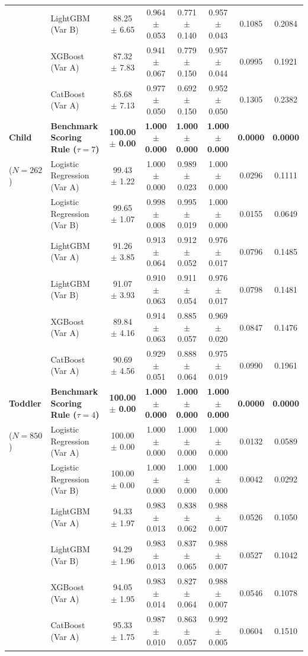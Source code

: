 \begin{table}[t]
\begin{tabular}{llcccccc}
 & LightGBM (Var B) & 88.25 $\pm$ 6.65 & 0.964 $\pm$ 0.053 & 0.771 $\pm$ 0.140 & 0.957 $\pm$ 0.043 & 0.1085 & 0.2084 \\
 & XGBoost (Var A) & 87.32 $\pm$ 7.83 & 0.941 $\pm$ 0.067 & 0.779 $\pm$ 0.150 & 0.957 $\pm$ 0.044 & 0.0995 & 0.1921 \\
 & CatBoost (Var A) & 85.68 $\pm$ 7.13 & 0.977 $\pm$ 0.050 & 0.692 $\pm$ 0.150 & 0.952 $\pm$ 0.050 & 0.1305 & 0.2382 \\
\midrule
\textbf{Child} & \textbf{Benchmark Scoring Rule ($\tau = 7$)} & \textbf{100.00 $\pm$ 0.00} & \textbf{1.000 $\pm$ 0.000} & \textbf{1.000 $\pm$ 0.000} & \textbf{1.000 $\pm$ 0.000} & \textbf{0.0000} & \textbf{0.0000} \\
($N = 262$) & Logistic Regression (Var A) & 99.43 $\pm$ 1.22 & 1.000 $\pm$ 0.000 & 0.989 $\pm$ 0.023 & 1.000 $\pm$ 0.000 & 0.0296 & 0.1111 \\
 & Logistic Regression (Var B) & 99.65 $\pm$ 1.07 & 0.998 $\pm$ 0.008 & 0.995 $\pm$ 0.019 & 1.000 $\pm$ 0.000 & 0.0155 & 0.0649 \\
 & LightGBM (Var A) & 91.26 $\pm$ 3.85 & 0.913 $\pm$ 0.064 & 0.912 $\pm$ 0.052 & 0.976 $\pm$ 0.017 & 0.0796 & 0.1485 \\
 & LightGBM (Var B) & 91.07 $\pm$ 3.93 & 0.910 $\pm$ 0.063 & 0.911 $\pm$ 0.054 & 0.976 $\pm$ 0.017 & 0.0798 & 0.1481 \\
 & XGBoost (Var A) & 89.84 $\pm$ 4.16 & 0.914 $\pm$ 0.063 & 0.885 $\pm$ 0.057 & 0.969 $\pm$ 0.020 & 0.0847 & 0.1476 \\
 & CatBoost (Var A) & 90.69 $\pm$ 4.56 & 0.929 $\pm$ 0.051 & 0.888 $\pm$ 0.064 & 0.975 $\pm$ 0.019 & 0.0990 & 0.1961 \\
\midrule
\textbf{Toddler} & \textbf{Benchmark Scoring Rule ($\tau = 4$)} & \textbf{100.00 $\pm$ 0.00} & \textbf{1.000 $\pm$ 0.000} & \textbf{1.000 $\pm$ 0.000} & \textbf{1.000 $\pm$ 0.000} & \textbf{0.0000} & \textbf{0.0000} \\
($N = 850$) & Logistic Regression (Var A) & 100.00 $\pm$ 0.00 & 1.000 $\pm$ 0.000 & 1.000 $\pm$ 0.000 & 1.000 $\pm$ 0.000 & 0.0132 & 0.0589 \\
 & Logistic Regression (Var B) & 100.00 $\pm$ 0.00 & 1.000 $\pm$ 0.000 & 1.000 $\pm$ 0.000 & 1.000 $\pm$ 0.000 & 0.0042 & 0.0292 \\
 & LightGBM (Var A) & 94.33 $\pm$ 1.97 & 0.983 $\pm$ 0.013 & 0.838 $\pm$ 0.062 & 0.988 $\pm$ 0.007 & 0.0526 & 0.1050 \\
 & LightGBM (Var B) & 94.29 $\pm$ 1.96 & 0.983 $\pm$ 0.013 & 0.837 $\pm$ 0.065 & 0.988 $\pm$ 0.007 & 0.0527 & 0.1042 \\
 & XGBoost (Var A) & 94.05 $\pm$ 1.95 & 0.983 $\pm$ 0.014 & 0.827 $\pm$ 0.064 & 0.988 $\pm$ 0.007 & 0.0546 & 0.1078 \\
 & CatBoost (Var A) & 95.33 $\pm$ 1.75 & 0.987 $\pm$ 0.010 & 0.863 $\pm$ 0.057 & 0.992 $\pm$ 0.005 & 0.0604 & 0.1510 \\
\bottomrule
\end{tabular}
\end{table}
